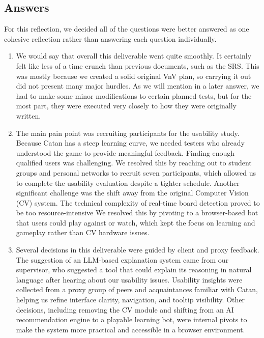 \documentclass[12pt, titlepage]{article}
\begin{document}
\subsection{Answers}
For this reflection, we decided all of the questions were better answered as one cohesive reflection rather than answering each question individually.
    \begin{enumerate}
        \item We would say that overall this deliverable went quite smoothly.
        It certainly felt like less of a time crunch than previous documents, such as the SRS.
        This was mostly because we created a solid original VnV plan, so carrying it out did not present many major hurdles.
        As we will mention in a later answer, we had to make some minor modifications to certain planned tests, but for the most part, they were executed very closely to how they were originally written.
        \item
        The main pain point was recruiting participants for the usability study. Because Catan has a steep learning curve, we needed testers who already understood the game to provide meaningful feedback. Finding enough qualified users was challenging. We resolved this by reaching out to student groups and personal networks to recruit seven participants, which allowed us to complete the usability evaluation despite a tighter schedule.  
        Another significant challenge was the shift away from the original Computer Vision (CV)
        system. The technical complexity of real-time board detection proved to be too resource-intensive
        We resolved this by pivoting to a browser-based bot that users could play against or watch,
        which kept the focus on learning and gameplay rather than CV hardware issues.
        \item
        Several decisions in this deliverable were guided by client and proxy feedback.
        The suggestion of an LLM-based explanation system came from our supervisor, who
        suggested a tool that could explain its reasoning in natural language after hearing about our usability issues.
        Usability insights were collected from a proxy group of peers and acquaintances familiar with Catan, 
        helping us refine interface clarity, navigation, and tooltip visibility. 
        Other decisions, including removing the CV module and shifting from an AI recommendation
        engine to a playable learning bot, were internal pivots to make the system more practical and 
        accessible in a browser environment.

\end{enumerate}
\end{document}
